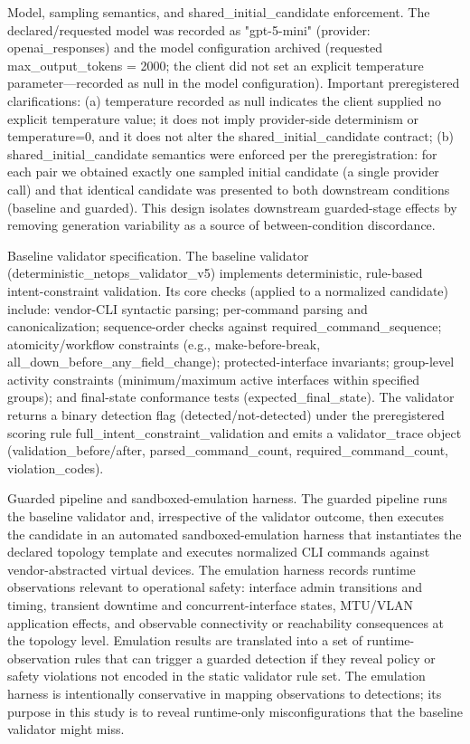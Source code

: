 \documentclass[conference]{IEEEtran}
\begin{document}
Model, sampling semantics, and shared\_initial\_candidate enforcement. The declared/requested model was recorded as "gpt-5-mini" (provider: openai\_responses) and the model configuration archived (requested max\_output\_tokens = 2000; the client did not set an explicit temperature parameter---recorded as null in the model configuration). Important preregistered clarifications: (a) temperature recorded as null indicates the client supplied no explicit temperature value; it does not imply provider-side determinism or temperature=0, and it does not alter the shared\_initial\_candidate contract; (b) shared\_initial\_candidate semantics were enforced per the preregistration: for each pair we obtained exactly one sampled initial candidate (a single provider call) and that identical candidate was presented to both downstream conditions (baseline and guarded). This design isolates downstream guarded-stage effects by removing generation variability as a source of between-condition discordance.

Baseline validator specification. The baseline validator (deterministic\_netops\_validator\_v5) implements deterministic, rule-based intent-constraint validation. Its core checks (applied to a normalized candidate) include: vendor-CLI syntactic parsing; per-command parsing and canonicalization; sequence-order checks against required\_command\_sequence; atomicity/workflow constraints (e.g., make-before-break, all\_down\_before\_any\_field\_change); protected-interface invariants; group-level activity constraints (minimum/maximum active interfaces within specified groups); and final-state conformance tests (expected\_final\_state). The validator returns a binary detection flag (detected/not-detected) under the preregistered scoring rule full\_intent\_constraint\_validation and emits a validator\_trace object (validation\_before/after, parsed\_command\_count, required\_command\_count, violation\_codes).

Guarded pipeline and sandboxed-emulation harness. The guarded pipeline runs the baseline validator and, irrespective of the validator outcome, then executes the candidate in an automated sandboxed-emulation harness that instantiates the declared topology template and executes normalized CLI commands against vendor-abstracted virtual devices. The emulation harness records runtime observations relevant to operational safety: interface admin transitions and timing, transient downtime and concurrent-interface states, MTU/VLAN application effects, and observable connectivity or reachability consequences at the topology level. Emulation results are translated into a set of runtime-observation rules that can trigger a guarded detection if they reveal policy or safety violations not encoded in the static validator rule set. The emulation harness is intentionally conservative in mapping observations to detections; its purpose in this study is to reveal runtime-only misconfigurations that the baseline validator might miss.
\end{document}
